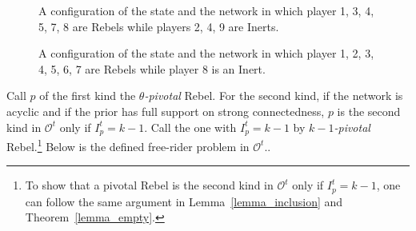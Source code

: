 \documentclass[12pt,letter]{article}
\newcommand{\Omicron}{\mathcal{O}}
\theoremstyle{definition}
\theoremstyle{remark}
\theoremstyle{claim}
\begin{document}
\begin{figure}

\begin{center}
\end{center}
\caption{A configuration of the state and the network in which player 1, 3, 4, 5, 7, 8 are Rebels while players 2, 4, 9 are Inerts.}
\label{fig:central_pivotal}
\end{figure}

\begin{figure}


\begin{center}
\end{center}
\caption{A configuration of the state and the network in which player 1, 2, 3, 4, 5, 6, 7 are Rebels while player 8 is an Inert.}
\label{fig:k-1_pivotal}
\end{figure}

Call $p$ of the first kind the \textit{$\theta$-pivotal} Rebel. For the second kind, if the network is acyclic and if the prior has full support on strong connectedness, $p$ is the second kind in $\Omicron^{t}$ only if $I^{t}_p=k-1$. Call the one with $I^t_p=k-1$ by \textit{$k-1$-pivotal} Rebel.\footnote{To show that a pivotal Rebel is the second kind in $\Omicron^{t}$ only if $I^{t}_p=k-1$, one can follow the same argument in Lemma~\ref{lemma_inclusion} and Theorem~\ref{lemma_empty}.} Below is the defined free-rider problem in $\Omicron^t$..
\end{document}
